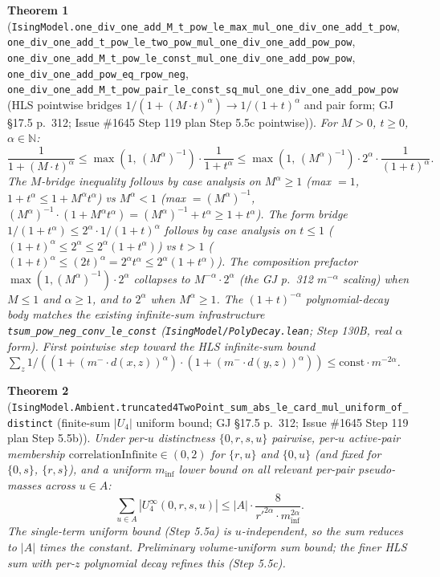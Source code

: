 \documentclass[a4paper,11pt]{article}
\newtheorem{theorem}{Theorem}
\begin{document}
\begin{theorem}[\texttt{IsingModel.one\_div\_one\_add\_M\_t\_pow\_le\_max\_mul\_one\_div\_one\_add\_t\_pow},
\texttt{one\_div\_one\_add\_t\_pow\_le\_two\_pow\_mul\_one\_div\_one\_add\_pow\_pow},
\texttt{one\_div\_one\_add\_M\_t\_pow\_le\_const\_mul\_one\_div\_one\_add\_pow\_pow},
\texttt{one\_div\_one\_add\_pow\_eq\_rpow\_neg},
\texttt{one\_div\_one\_add\_M\_t\_pow\_pair\_le\_const\_sq\_mul\_one\_div\_one\_add\_pow\_pow}
(HLS pointwise bridges $1/(1+(M\cdot t)^\alpha) \to 1/(1+t)^\alpha$ and pair form;
GJ \S17.5 p.~312; Issue \#1645 Step 119 plan Step 5.5c pointwise)]
For $M > 0$, $t \ge 0$, $\alpha \in \mathbb{N}$:
\[
  \frac{1}{1 + (M\cdot t)^\alpha}
    \le \max(1,\,(M^\alpha)^{-1})\cdot\frac{1}{1 + t^\alpha}
    \le \max(1,\,(M^\alpha)^{-1})\cdot 2^\alpha\cdot\frac{1}{(1+t)^\alpha}.
\]
The $M$-bridge inequality follows by case analysis on $M^\alpha\ge 1$ (max $= 1$,
$1 + t^\alpha \le 1 + M^\alpha t^\alpha$) vs $M^\alpha < 1$ (max $= (M^\alpha)^{-1}$,
$(M^\alpha)^{-1}\cdot(1 + M^\alpha t^\alpha) = (M^\alpha)^{-1} + t^\alpha \ge 1 + t^\alpha$).
The form bridge $1/(1+t^\alpha) \le 2^\alpha\cdot 1/(1+t)^\alpha$ follows by case
analysis on $t \le 1$ ($(1+t)^\alpha \le 2^\alpha\le 2^\alpha(1+t^\alpha)$) vs
$t > 1$ ($(1+t)^\alpha \le (2t)^\alpha = 2^\alpha t^\alpha \le 2^\alpha(1+t^\alpha)$).
The composition prefactor $\max(1, (M^\alpha)^{-1})\cdot 2^\alpha$ collapses to
$M^{-\alpha}\cdot 2^\alpha$ (the GJ p.~312 $m^{-\alpha}$ scaling) when $M\le 1$ and
$\alpha\ge 1$, and to $2^\alpha$ when $M^\alpha\ge 1$. The $(1+t)^{-\alpha}$
polynomial-decay body matches the existing infinite-sum infrastructure
\texttt{tsum\_pow\_neg\_conv\_le\_const} (\texttt{IsingModel/PolyDecay.lean}; Step 130B,
real $\alpha$ form). First pointwise step toward the HLS infinite-sum bound
$\sum_z 1/((1+(m^-\cdot d(x,z))^\alpha)\cdot(1+(m^-\cdot d(y,z))^\alpha))
  \le \mathrm{const}\cdot m^{-2\alpha}$.
\end{theorem}

\begin{theorem}[\texttt{IsingModel.Ambient.truncated4TwoPoint\_sum\_abs\_le\_card\_mul\_uniform\_of\_distinct}
(finite-sum $|U_4|$ uniform bound; GJ \S17.5 p.~312; Issue \#1645 Step 119 plan Step 5.5b)]
Under per-$u$ distinctness $\{0, r, s, u\}$ pairwise, per-$u$ active-pair membership
$\mathrm{correlationInfinite}\in(0,2)$ for $\{r,u\}$ and $\{0,u\}$ (and fixed for $\{0,s\}$,
$\{r,s\}$), and a uniform $m_{\mathrm{inf}}$ lower bound on all relevant per-pair
pseudo-masses across $u\in A$:
\[
  \sum_{u\in A} |U_4^\infty(0, r, s, u)|
    \le |A|\cdot\frac{8}{r'^{2\alpha}\cdot m_{\mathrm{inf}}^{2\alpha}}.
\]
The single-term uniform bound (Step 5.5a) is $u$-independent, so the sum reduces to $|A|$
times the constant. Preliminary volume-uniform sum bound; the finer HLS sum with per-$z$
polynomial decay refines this (Step 5.5c).
\end{theorem}
\end{document}
